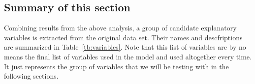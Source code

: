 \documentclass [11pt, proquest] {uwthesis}[2015/03/03]
\begin{document}
%

\subsection{Summary of this section}

Combining results from the above analysis, a group of candidate explanatory variables is extracted from the original data set. Their names and descfriptions are summarized in Table~\ref{tb:variables}. Note that this list of variables are by no means the final list of variables used in the model and used altogether every time. It just represents the group of variables that we will be testing with in the following sections. 
\end{document}
